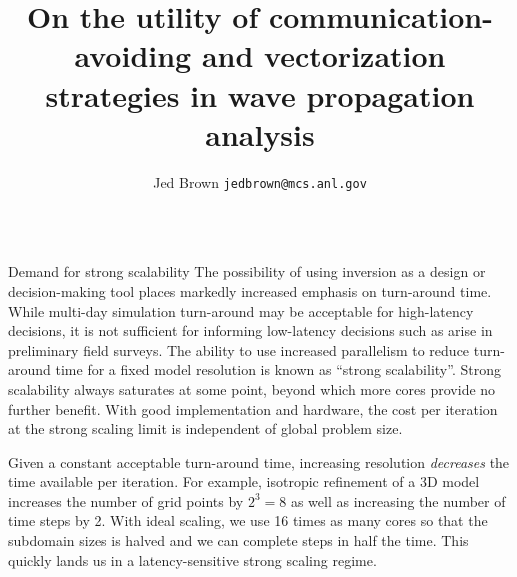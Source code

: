 \documentclass[final,t]{beamer}
\title{\huge On the utility of communication-avoiding and vectorization strategies in wave propagation analysis}
\author[Jed Brown]{Jed Brown {\texttt{jedbrown@mcs.anl.gov}}}
\institute[MCS]{Download this poster from \url{http://59A2.org/files/20130715-CIGQUEST.pdf}}
\begin{document}
\begin{frame}{} 
  \vspace{-3em}
  \begin{columns}
    \begin{column}{0.31\textwidth}
      \begin{block}{Demand for strong scalability}
        The possibility of using inversion as a design or decision-making tool places markedly increased emphasis on turn-around time.
        While multi-day simulation turn-around may be acceptable for high-latency decisions, it is not sufficient for informing low-latency decisions such as arise in preliminary field surveys.
        The ability to use increased parallelism to reduce turn-around time for a fixed model resolution is known as ``strong scalability''.
        Strong scalability always saturates at some point, beyond which more cores provide no further benefit.
        With good implementation and hardware, the cost per iteration at the strong scaling limit is independent of global problem size.

        Given a constant acceptable turn-around time, increasing resolution \emph{decreases} the time available per iteration.
        For example, isotropic refinement of a 3D model increases the number of grid points by $2^3 = 8$ as well as increasing the number of time steps by 2.
        With ideal scaling, we use 16 times as many cores so that the subdomain sizes is halved and we can complete steps in half the time.
        This quickly lands us in a latency-sensitive strong scaling regime.
      \end{block}

      \vspace{-2em}


\end{column}
\end{columns}
\end{frame}
\end{document}

